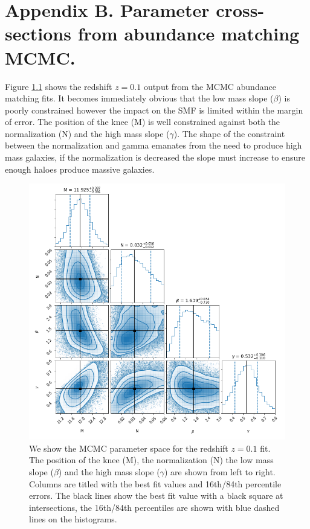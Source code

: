 \chapter{Appendix B. Parameter cross-sections from abundance matching MCMC.}

\label{Appx:AbnMCMC}

Figure \ref{fig:MCMC_lz} shows the redshift $z = 0.1$ output from the MCMC abundance matching fits. It becomes immediately obvious that the low mass slope ($\beta$) is poorly constrained however the impact on the SMF is limited within the margin of error. The position of the knee (M) is well constrained against both the normalization (N) and the high mass slope ($\gamma$). The shape of the constraint between the normalization and gamma emanates from the need to produce high mass galaxies, if the normalization is decreased the slope must increase to ensure enough haloes produce massive galaxies.

\begin{figure}
	\centering
	\includegraphics[width = \linewidth]{MCMC_plot_lz.png}
    \caption{We show the MCMC parameter space for the redshift $z = 0.1$ fit. The position of the knee (M), the normalization (N) the low mass slope ($\beta$) and the high mass slope ($\gamma$) are shown from left to right. Columns are titled with the best fit values and 16th/84th percentile errors. The black lines show the best fit value with a black square at intersections, the 16th/84th percentiles are shown with blue dashed lines on the histograms.}
	\label{fig:MCMC_lz}
\end{figure}

